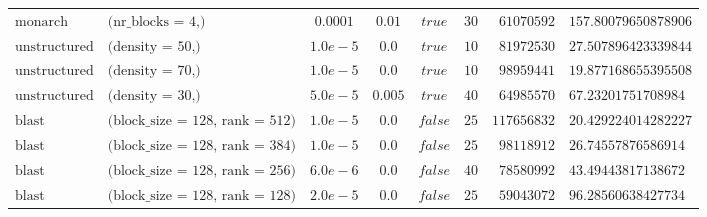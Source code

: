 \begin{sidewaystable}[h!]
\begin{tabular}{llcccrrl}
$\text{monarch}$ & $\text{(nr\_blocks = 4,)}$ & $0.0001$ & $0.01$ & $true$ & $30$ & $61070592$ & $157.80079650878906$\\
$\text{unstructured}$ & $\text{(density = 50,)}$ & $1.0e-5$ & $0.0$ & $true$ & $10$ & $81972530$ & $27.507896423339844$\\
$\text{unstructured}$ & $\text{(density = 70,)}$ & $1.0e-5$ & $0.0$ & $true$ & $10$ & $98959441$ & $19.877168655395508$\\
$\text{unstructured}$ & $\text{(density = 30,)}$ & $5.0e-5$ & $0.005$ & $true$ & $40$ & $64985570$ & $67.23201751708984$\\
$\text{blast}$ & $\text{(block\_size = 128, rank = 512)}$ & $1.0e-5$ & $0.0$ & $false$ & $25$ & $117656832$ & $20.429224014282227$\\
$\text{blast}$ & $\text{(block\_size = 128, rank = 384)}$ & $1.0e-5$ & $0.0$ & $false$ & $25$ & $98118912$ & $26.74557876586914$\\
$\text{blast}$ & $\text{(block\_size = 128, rank = 256)}$ & $6.0e-6$ & $0.0$ & $false$ & $40$ & $78580992$ & $43.49443817138672$\\
$\text{blast}$ & $\text{(block\_size = 128, rank = 128)}$ & $2.0e-5$ & $0.0$ & $false$ & $25$ & $59043072$ & $96.28560638427734$\\
\end{tabular}

\end{sidewaystable}
